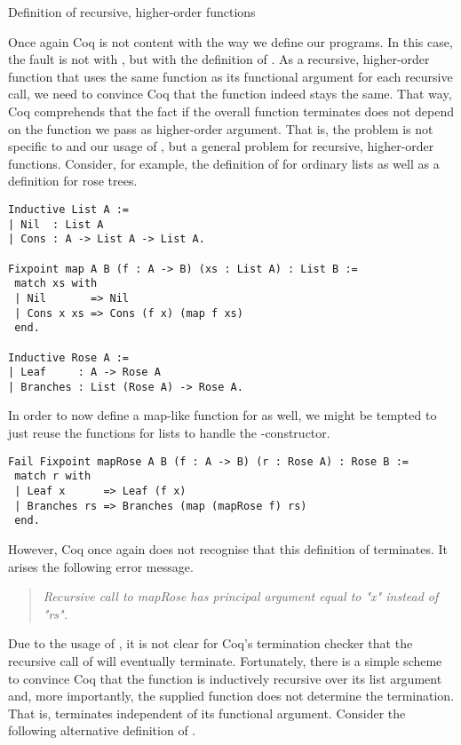 \begin{excursus}{Definition of recursive, higher-order functions}

Once again Coq is not content with the way we define our programs.
In this case, the fault is not with , but with the
definition of .
As a recursive, higher-order function that uses the same function as its
functional argument for each recursive call, we need to convince Coq
that the function indeed stays the same.
That way, Coq comprehends that the fact if the overall function
terminates does not depend on the function we pass as higher-order
argument.
That is, the problem is not specific to  and our usage
of , but a general problem for recursive, higher-order
functions.
Consider, for example, the definition of  for ordinary
lists as well as a definition for rose trees.

\begin{verbatim}
Inductive List A :=
| Nil  : List A
| Cons : A -> List A -> List A.

Fixpoint map A B (f : A -> B) (xs : List A) : List B :=
 match xs with
 | Nil       => Nil
 | Cons x xs => Cons (f x) (map f xs)
 end.

Inductive Rose A :=
| Leaf     : A -> Rose A
| Branches : List (Rose A) -> Rose A.
\end{verbatim}

In order to now define a map-like function for  as well, we
might be tempted to just reuse the  functions for lists to
handle the -constructor.

\begin{verbatim}
Fail Fixpoint mapRose A B (f : A -> B) (r : Rose A) : Rose B :=
 match r with
 | Leaf x      => Leaf (f x)
 | Branches rs => Branches (map (mapRose f) rs)
 end.
\end{verbatim}

However, Coq once again does not recognise that this definition of
 terminates.
It arises the following error message.

\begin{quote}
\emph{Recursive call to mapRose has principal argument equal to "x" instead of "rs".}
 \end{quote}

Due to the usage of , it is not clear for Coq's termination
checker that the recursive call of  will eventually
terminate.
Fortunately, there is a simple scheme to convince Coq that the
function  is inductively recursive over its list argument
and, more importantly, the supplied function does not determine the
termination.
That is,  terminates independent of its functional argument.
Consider the following alternative definition of .


\end{excursus}
